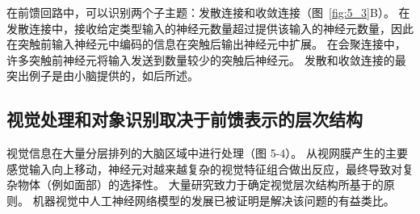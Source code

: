在前馈回路中，可以识别两个子主题：发散连接和收敛连接（图~\ref{fig:5_3}B）。 
在发散连接中，接收给定类型输入的神经元数量超过提供该输入的神经元数量，因此在突触前输入神经元中编码的信息在突触后输出神经元中扩展。
在会聚连接中，许多突触前神经元将输入发送到数量较少的突触后神经元。
发散和收敛连接的最突出例子是由小脑提供的，如后所述。



\subsection{视觉处理和对象识别取决于前馈表示的层次结构}

视觉信息在大量分层排列的大脑区域中进行处理（图 5-4）。
从视网膜产生的主要感觉输入向上移动，神经元对越来越复杂的视觉特征组合做出反应，最终导致对复杂物体（例如面部）的选择性。
大量研究致力于确定视觉层次结构所基于的原则。
机器视觉中人工神经网络模型的发展已被证明是解决该问题的有益类比。


